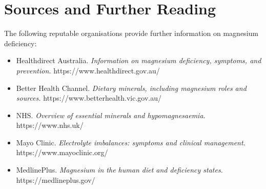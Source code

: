 \section*{Sources and Further Reading}
The following reputable organisations provide further information on magnesium deficiency:
\begin{itemize}
    \item Healthdirect Australia. \textit{Information on magnesium deficiency, symptoms, and prevention.} https://www.healthdirect.gov.au/
    \item Better Health Channel. \textit{Dietary minerals, including magnesium roles and sources.} https://www.betterhealth.vic.gov.au/
    \item NHS. \textit{Overview of essential minerals and hypomagnesaemia.} https://www.nhs.uk/
    \item Mayo Clinic. \textit{Electrolyte imbalances: symptoms and clinical management.} https://www.mayoclinic.org/
    \item MedlinePlus. \textit{Magnesium in the human diet and deficiency states.} https://medlineplus.gov/
\end{itemize}
